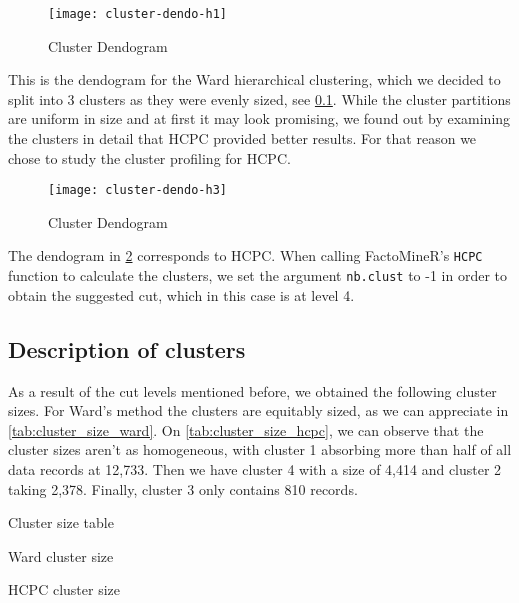 
\begin{figure}[H]
    \centering
    \texttt{[image: cluster-dendo-h1]}
    \caption{Cluster Dendogram}%
    \label{fig:dendogram-h2}
\end{figure}

This is the dendogram for the Ward hierarchical clustering, which we decided to split into 3 clusters
as they were evenly sized, see \cref{sub:description_of_clusters}. While the cluster 
partitions are uniform in size and at first it may look promising, we found out by examining 
the clusters in detail that HCPC provided better results. For that reason we chose to study the
cluster profiling for HCPC.

\begin{landscape}

\begin{figure}[H]
    \centering
    \texttt{[image: cluster-dendo-h3]}
    \caption{Cluster Dendogram}%
    \label{fig:dendogram-final}
\end{figure}

\end{landscape}

The dendogram in \cref{fig:dendogram-final} corresponds to HCPC. When calling FactoMineR's \texttt{HCPC}
function to calculate the clusters, we set the argument \texttt{nb.clust} to -1 in order to obtain the
suggested cut, which in this case is at level 4.


\subsection{Description of clusters}%
\label{sub:description_of_clusters}

As a result of the cut levels mentioned before, we obtained the following cluster sizes.
For Ward's method the clusters are equitably sized, as we can appreciate in
\cref{tab:cluster_size_ward}. On \cref{tab:cluster_size_hcpc}, we can observe that
the cluster sizes aren't as homogeneous, with cluster 1 absorbing more than half
of all data records at 12,733. Then we have cluster 4 with a size of 4,414 and cluster 2
taking 2,378. Finally, cluster 3 only contains 810 records.

\begin{table}[h!]
\vspace{5pt}
\caption{Cluster size table}%
\label{tab:cluster_size}
\centering
\begin{subtable}[t]{.3\textwidth}
    \centering
    \caption{Ward cluster size}%
    \label{tab:cluster_size_ward}
    
\end{subtable}
\begin{subtable}[t]{.3\textwidth}
    \centering
    \caption{HCPC cluster size}%
    \label{tab:cluster_size_hcpc}
    
\end{subtable}
\end{table}

